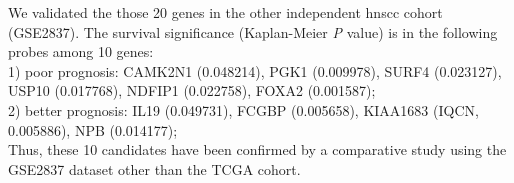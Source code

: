 \documentclass[12pt, a4paper]{article}
\newcommand{\bcaption}[2]{\caption{\textbf{#1} #2}}
\begin{document}
We validated the those 20 genes in the other independent \acrshort{hnscc} cohort (GSE2837).
The survival significance (Kaplan-Meier \textit{P} value) is in the following probes among 10 genes:\\
1) poor prognosis: CAMK2N1 (0.048214), PGK1 (0.009978), SURF4 (0.023127), USP10 (0.017768), NDFIP1 (0.022758), FOXA2 (0.001587);\\ %
2) better prognosis: IL19 (0.049731), FCGBP (0.005658), KIAA1683 (IQCN, 0.005886), NPB (0.014177);\\
Thus, these 10 candidates have been confirmed by a comparative study using the GSE2837 dataset other than the TCGA cohort.



\begin{figure}[hp]
\centering
\label{fig:figure2}
\end{figure}

\end{document}
